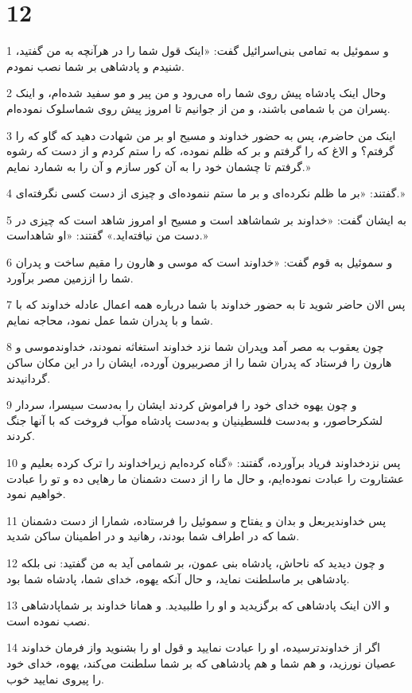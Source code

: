 \chapter{12}

\par 1 و سموئیل به تمامی بنی‌اسرائیل گفت: «اینک قول شما را در هرآنچه به من گفتید، شنیدم و پادشاهی بر شما نصب نمودم.
\par 2 وحال اینک پادشاه پیش روی شما راه می‌رود و من پیر و مو سفید شده‌ام، و اینک پسران من با شمامی باشند، و من از جوانیم تا امروز پیش روی شماسلوک نموده‌ام.
\par 3 اینک من حاضرم، پس به حضور خداوند و مسیح او بر من شهادت دهید که گاو که را گرفتم؟ و الاغ که را گرفتم و بر که ظلم نموده، که را ستم کردم و از دست که رشوه گرفتم تا چشمان خود را به آن کور سازم و آن را به شمارد نمایم.»
\par 4 گفتند: «بر ما ظلم نکرده‌ای و بر ما ستم ننموده‌ای و چیزی از دست کسی نگرفته‌ای.»
\par 5 به ایشان گفت: «خداوند بر شماشاهد است و مسیح او امروز شاهد است که چیزی در دست من نیافته‌اید.» گفتند: «او شاهداست.»
\par 6 و سموئیل به قوم گفت: «خداوند است که موسی و هارون را مقیم ساخت و پدران شما را اززمین مصر برآورد.
\par 7 پس الان حاضر شوید تا به حضور خداوند با شما درباره همه اعمال عادله خداوند که با شما و با پدران شما عمل نمود، محاجه نمایم.
\par 8 چون یعقوب به مصر آمد وپدران شما نزد خداوند استغاثه نمودند، خداوندموسی و هارون را فرستاد که پدران شما را از مصربیرون آورده، ایشان را در این مکان ساکن گردانیدند.
\par 9 و چون یهوه خدای خود را فراموش کردند ایشان را به‌دست سیسرا، سردار لشکرحاصور، و به‌دست فلسطینیان و به‌دست پادشاه موآب فروخت که با آنها جنگ کردند.
\par 10 پس نزدخداوند فریاد برآورده، گفتند: «گناه کرده‌ایم زیراخداوند را ترک کرده بعلیم و عشتاروت را عبادت نموده‌ایم، و حال ما را از دست دشمنان ما رهایی ده و تو را عبادت خواهیم نمود.
\par 11 پس خداوندیربعل و بدان و یفتاح و سموئیل را فرستاده، شمارا از دست دشمنان شما که در اطراف شما بودند، رهانید و در اطمینان ساکن شدید.
\par 12 و چون دیدید که ناحاش، پادشاه بنی عمون، بر شمامی آید به من گفتید: نی بلکه پادشاهی بر ماسلطنت نماید، و حال آنکه یهوه، خدای شما، پادشاه شما بود.
\par 13 و الان اینک پادشاهی که برگزیدید و او را طلبیدید. و همانا خداوند بر شماپادشاهی نصب نموده است.
\par 14 اگر از خداوندترسیده، او را عبادت نمایید و قول او را بشنوید واز فرمان خداوند عصیان نورزید، و هم شما و هم پادشاهی که بر شما سلطنت می‌کند، یهوه، خدای خود را پیروی نمایید خوب.
